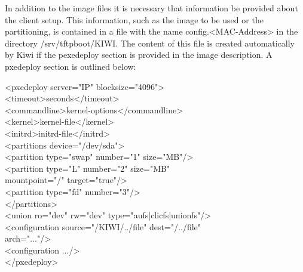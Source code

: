 \begin{itemize}
    In addition to the image files it is necessary that information be
    provided about the client setup. This information, such as the image
    to be used or the partitioning, is contained in a file with the name
    config.<MAC-Address> in the directory /srv/tftpboot/KIWI. The content
    of this file is created automatically by Kiwi if the pexedeploy section
    is provided in the image description. A pxedeploy section is outlined
    below:
	
	\begin{Command}{14cm}
	<pxedeploy server="IP" blocksize="4096">\\
	\hspace*{1cm}<timeout>seconds</timeout>\\
	\hspace*{1cm}<commandline>kernel-options</commandline>\\
	\hspace*{1cm}<kernel>kernel-file</kernel>\\
	\hspace*{1cm}<initrd>initrd-file</initrd>\\
	\hspace*{1cm}<partitions device="/dev/sda">\\
	\hspace*{2cm}<partition type="swap" number="1" size="MB"/>\\
	\hspace*{2cm}<partition type="L" number="2" size="MB"\\
	\hspace*{4.5cm}mountpoint="/" target="true"/>\\
	\hspace*{2cm}<partition type="fd" number="3"/>\\
	\hspace*{1cm}</partitions>\\
	\hspace*{1cm}<union ro="dev" rw="dev" type="aufs|clicfs|unionfs"/>\\
	\hspace*{1cm}<configuration source="/KIWI/../file" dest="/../file"\\
	\hspace*{4.5cm}arch="..."/>\\
	\hspace*{1cm}<configuration .../>\\
	</pxedeploy>
	\end{Command}


\end{itemize}

